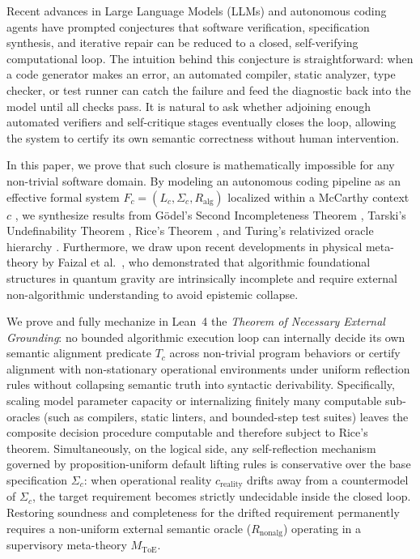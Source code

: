 \documentclass[11pt]{article}
\theoremstyle{plain}
\theoremstyle{definition}
\theoremstyle{remark}
\newcommand{\Rnonalg}{R_{\mathrm{nonalg}}}
\newcommand{\Ralg}{R_{\mathrm{alg}}}
\newcommand{\MToE}{M_{\mathrm{ToE}}}
\newcommand{\creal}{c_{\mathrm{reality}}}
\begin{document}
Recent advances in Large Language Models (LLMs) and autonomous coding agents have
prompted conjectures that software verification, specification synthesis, and
iterative repair can be reduced to a closed, self-verifying computational loop.
The intuition behind this conjecture is straightforward: when a code generator
makes an error, an automated compiler, static analyzer, type checker, or test
runner can catch the failure and feed the diagnostic back into the model until
all checks pass. It is natural to ask whether adjoining enough automated
verifiers and self-critique stages eventually closes the loop, allowing the
system to certify its own semantic correctness without human intervention.

In this paper, we prove that such closure is mathematically impossible for any
non-trivial software domain. By modeling an autonomous coding pipeline as an
effective formal system $F_c = (L_c, \Sigma_c, \Ralg)$ localized within a
McCarthy context $c$ \cite{mccarthy93}, we synthesize results from G\"odel's
Second Incompleteness Theorem \cite{godel31}, Tarski's Undefinability Theorem
\cite{tarski36}, Rice's Theorem \cite{rice53}, and Turing's relativized oracle
hierarchy \cite{turing39}. Furthermore, we draw upon recent developments in
physical meta-theory by Faizal et al.\ \cite{faizal25}, who demonstrated that
algorithmic foundational structures in quantum gravity are intrinsically
incomplete and require external non-algorithmic understanding to avoid epistemic
collapse.

We prove and fully mechanize in Lean~4 \cite{lean4,mathlib20} the \emph{Theorem
of Necessary External Grounding}: no bounded algorithmic execution loop can
internally decide its own semantic alignment predicate $T_c$ across non-trivial
program behaviors or certify alignment with non-stationary operational
environments under uniform reflection rules without collapsing semantic truth
into syntactic derivability. Specifically, scaling model parameter capacity or
internalizing finitely many computable sub-oracles (such as compilers, static
linters, and bounded-step test suites) leaves the composite decision procedure
computable and therefore subject to Rice's theorem. Simultaneously, on the
logical side, any self-reflection mechanism governed by proposition-uniform
default lifting rules \cite{reiter80} is conservative over the base
specification $\Sigma_c$: when operational reality $\creal$ drifts away from a
countermodel of $\Sigma_c$, the target requirement becomes strictly undecidable
inside the closed loop. Restoring soundness and completeness for the drifted
requirement permanently requires a non-uniform external semantic oracle
($\Rnonalg$) operating in a supervisory meta-theory $\MToE$.
\end{document}

